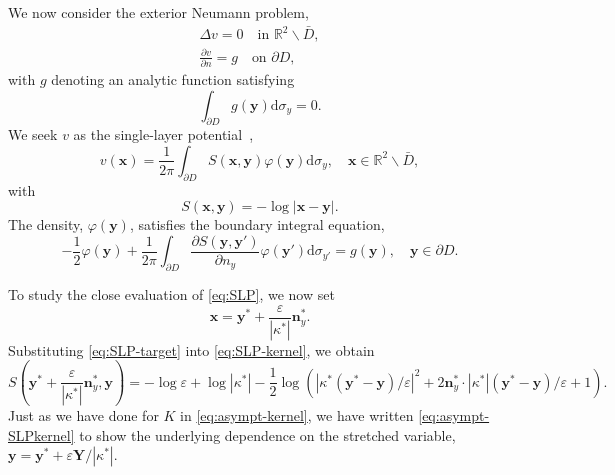 \documentclass{article}[12pt]
\renewcommand{\epsilon}{\varepsilon}
\numberwithin{equation}{section}
\begin{document}
We now consider the exterior Neumann problem,
\begin{subequations}
  \begin{gather}
    \Delta v = 0 \quad \text{in $\mathbb{R}^{2} \backslash
      \bar{D}$}, \label{eq:4.1a}\\
    \frac{\partial v}{\partial n} = g \quad \text{on $\partial
      D$}, \label{eq:4.1b}
  \end{gather}
  \label{eq:4.1}
\end{subequations}
with $g$ denoting an analytic function satisfying
\begin{equation}
  \int_{\partial D} g(\mathbf{y}) \mathrm{d}\sigma_{y} = 0.
  \label{eq:4.2}
\end{equation}
We seek $v$ as the single-layer potential~\cite{kress1999linear},
\begin{equation}
  v(\mathbf{x}) = \frac{1}{2\pi} \int_{\partial D}
  S(\mathbf{x},\mathbf{y}) \varphi(\mathbf{y}) \mathrm{d}\sigma_{y},
  \quad \mathbf{x} \in \mathbb{R}^{2} \backslash \bar{D},
  \label{eq:SLP}
\end{equation}
with
\begin{equation}
  S(\mathbf{x},\mathbf{y}) = - \log | \mathbf{x} - \mathbf{y} | .
  \label{eq:SLP-kernel}
\end{equation}
The density, $\varphi(\mathbf{y})$, satisfies the boundary integral
equation,
\begin{equation}
  - \frac{1}{2} \varphi(\mathbf{y}) + \frac{1}{2\pi} \int_{\partial D}
  \frac{\partial S(\mathbf{y},\mathbf{y'}) }{\partial n_{y} }
  \varphi(\mathbf{y}') \mathrm{d}\sigma_{y'} = g(\mathbf{y}), \quad
  \mathbf{y} \in \partial D.
  \label{eq:SLP-BIE}
\end{equation}

To study the close evaluation of \eqref{eq:SLP}, we now set 
\begin{equation}
  \mathbf{x} = \mathbf{y}^{\ast} + \frac{\epsilon}{|\kappa^{\ast}|}
  \mathbf{n}_{y}^{\ast}.
  \label{eq:SLP-target}
\end{equation}
Substituting \eqref{eq:SLP-target} into \eqref{eq:SLP-kernel}, we obtain
\begin{equation}
  S\left(\mathbf{y}^{\ast} + \frac{\epsilon}
{  |\kappa^{\ast}| }\mathbf{n}_{y}^{\ast},
  \mathbf{y} \right) = - \log \epsilon +
  \log | \kappa^{\ast} | - \frac{1}{2} \log\left(  | \kappa^{\ast}
    ( \mathbf{y}^{\ast} - \mathbf{y} )/\epsilon |^{2} + 2 
    \mathbf{n}_{y}^{\ast} \cdot | \kappa^{\ast} | ( \mathbf{y}^{\ast}
    - \mathbf{y} )/\epsilon + 1 \right).
  \label{eq:asympt-SLPkernel}
\end{equation}
Just as we have done for $K$ in \eqref{eq:asympt-kernel}, we have
written \eqref{eq:asympt-SLPkernel} to show the underlying dependence
on the stretched variable,
$\mathbf{y} = \mathbf{y}^{\ast} + \epsilon
\mathbf{Y}/|\kappa^{\ast}|$.
\end{document}
